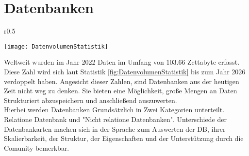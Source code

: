 \section{Datenbanken}
\begin{wrapfigure}{r}{0.5\textwidth}
    \vspace{-1.2cm}
    \begin{center}
      \texttt{[image: DatenvolumenStatistik]}
    \end{center}
    \vspace{-0.5cm}
    \caption{Volumen der weltweit generierten Daten bis 2027 \cite{Datenmengen}}
    \label{fig:DatenvolumenStatistik}
    \vspace{-0.5cm}
  \end{wrapfigure}
Weltweit wurden im Jahr 2022 Daten im Umfang von 103.66 Zettabyte erfasst. Diese Zahl wird sich laut Statistik \ref{fig:DatenvolumenStatistik} bis zum Jahr 2026 verdoppelt haben. Angesicht dieser Zahlen, sind Datenbanken aus der heutigen Zeit nicht weg zu denken. Sie bieten eine Möglichkeit, große Mengen an Daten Strukturiert abzuspeichern und anschließend auszuwerten.\\
Hierbei werden Datenbanken Grundsätzlich in Zwei Kategorien unterteilt. Relatione Datenbank und "Nicht relatione Datenbanken". Unterschiede der Datenbankarten machen sich in der Sprache zum Auswerten der DB, ihrer Skalierbarkeit, der Struktur, der Eigenschaften und der Unterstützung durch die Comunity bemerkbar. 

